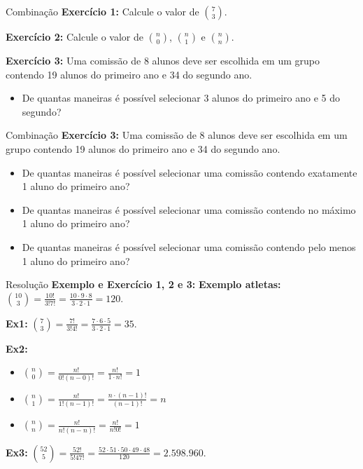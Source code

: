\documentclass[9pt]{beamer}
\begin{document}
\begin{frame}{Combinação}
\textbf{Exercício 1:} Calcule o valor de $\binom{7}{3}$.

\vspace{0.3cm}

\textbf{Exercício 2:} Calcule o valor de $\binom{n}{0}$, $\binom{n}{1}$ e $\binom{n}{n}$.

\vspace{0.3cm}

\textbf{Exercício 3:} Uma comissão de 8 alunos deve ser escolhida em um grupo contendo 19 alunos do primeiro ano e 34 do segundo ano.
\begin{itemize}
    \item[a)] De quantas maneiras é possível selecionar 3 alunos do primeiro ano e 5 do segundo?
\end{itemize}
\end{frame}

\begin{frame}{Combinação}
\textbf{Exercício 3:} Uma comissão de 8 alunos deve ser escolhida em um grupo contendo 19 alunos do primeiro ano e 34 do segundo ano.
\begin{itemize}
    \item[b)] De quantas maneiras é possível selecionar uma comissão contendo exatamente 1 aluno do primeiro ano?
    \item[c)] De quantas maneiras é possível selecionar uma comissão contendo no máximo 1 aluno do primeiro ano?
    \item[d)] De quantas maneiras é possível selecionar uma comissão contendo pelo menos 1 aluno do primeiro ano?
\end{itemize}
\end{frame}

\begin{frame}{Resolução}
\textbf{Exemplo e Exercício 1, 2 e 3:}
\textbf{Exemplo atletas:} $\binom{10}{3} = \frac{10!}{3!7!} = \frac{10 \cdot 9 \cdot 8}{3 \cdot 2 \cdot 1} = 120$.

\vspace{0.2cm}
\textbf{Ex1:} $\binom{7}{3} = \frac{7!}{3!4!} = \frac{7 \cdot 6 \cdot 5}{3 \cdot 2 \cdot 1} = 35$.

\vspace{0.2cm}
\textbf{Ex2:}
\begin{itemize}
    \item $\binom{n}{0} = \frac{n!}{0!(n-0)!} = \frac{n!}{1 \cdot n!} = 1$
    \item $\binom{n}{1} = \frac{n!}{1!(n-1)!} = \frac{n \cdot (n-1)!}{(n-1)!} = n$
    \item $\binom{n}{n} = \frac{n!}{n!(n-n)!} = \frac{n!}{n!0!} = 1$
\end{itemize}

\vspace{0.2cm}
\textbf{Ex3:} $\binom{52}{5} = \frac{52!}{5!47!} = \frac{52 \cdot 51 \cdot 50 \cdot 49 \cdot 48}{120} = 2.598.960$.
\end{frame}
\end{document}

